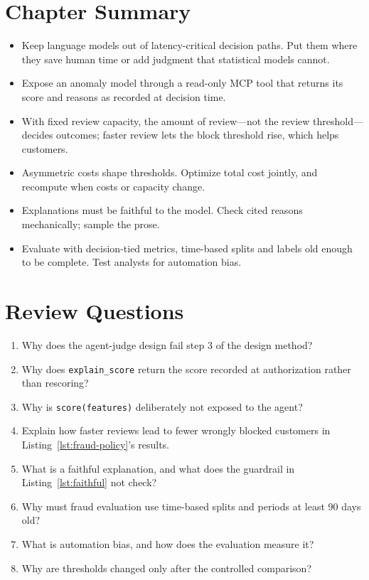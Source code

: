 \section*{Chapter Summary}

\begin{itemize}[itemsep=2pt]
  \item Keep language models out of latency-critical decision paths. Put them where they save human time or add judgment that statistical models cannot.
  \item Expose an anomaly model through a read-only MCP tool that returns its score and reasons as recorded at decision time.
  \item With fixed review capacity, the amount of review---not the review threshold---decides outcomes; faster review lets the block threshold rise, which helps customers.
  \item Asymmetric costs shape thresholds. Optimize total cost jointly, and recompute when costs or capacity change.
  \item Explanations must be faithful to the model. Check cited reasons mechanically; sample the prose.
  \item Evaluate with decision-tied metrics, time-based splits and labels old enough to be complete. Test analysts for automation bias.
\end{itemize}

\section*{Review Questions}

\begin{enumerate}[itemsep=2pt]
  \item Why does the agent-judge design fail step 3 of the design method?
  \item Why does \texttt{explain\_score} return the score recorded at authorization rather than rescoring?
  \item Why is \texttt{score(features)} deliberately not exposed to the agent?
  \item Explain how faster reviews lead to fewer wrongly blocked customers in Listing~\ref{lst:fraud-policy}'s results.
  \item What is a faithful explanation, and what does the guardrail in Listing~\ref{lst:faithful} not check?
  \item Why must fraud evaluation use time-based splits and periods at least 90 days old?
  \item What is automation bias, and how does the evaluation measure it?
  \item Why are thresholds changed only after the controlled comparison?
\end{enumerate}

